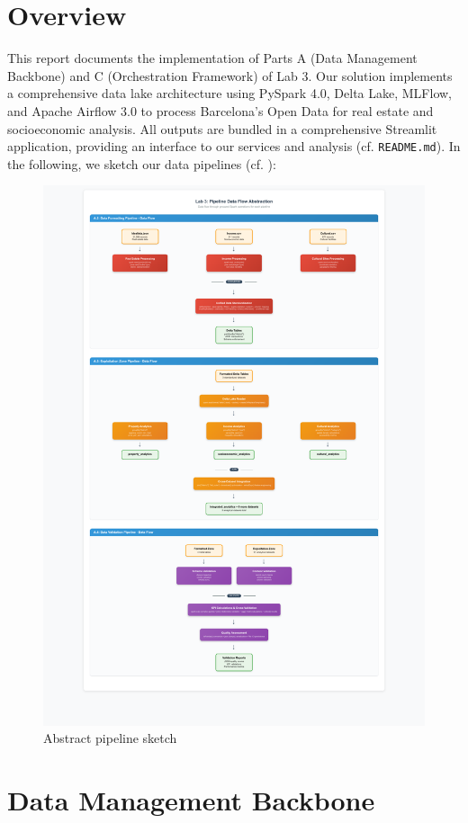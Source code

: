 \section*{Overview}

This report documents the implementation of Parts A (Data Management Backbone) and C (Orchestration Framework) of Lab 3. Our solution implements a comprehensive data lake architecture using PySpark 4.0, Delta Lake, MLFlow, and Apache Airflow 3.0 to process Barcelona's Open Data for real estate and socioeconomic analysis. All outputs are bundled in a comprehensive Streamlit application, providing an interface to our services and analysis (cf. \verb|README.md|). In the following, we sketch our data pipelines (cf. ):

\begin{figure}[H]
    \centering
    \includegraphics[width=.8\linewidth]{latex/imgs/pipeline_abstraction.pdf}
    \caption{Abstract pipeline sketch}
    \label{fig:pipe_abs}
\end{figure}

\section{Data Management Backbone}

